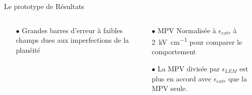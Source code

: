 \begin{frame}{Le prototype de \TOO{}}{Résultats}
\begin{scriptsize}
\begin{columns}
\begin{column}{0.5\textwidth}
\begin{itemize}
                        \item[$\bullet$] Grandes barres d'erreur à faibles champs dues aux imperfections de la planéité
                    \end{itemize}
                \end{column}
                \begin{column}{0.5\textwidth}
                    \begin{itemize}
                        \item[$\bullet$] MPV Normalisée à $\epsilon_{extr}$ à \SI{2}{\kilo\volt\per\centi\meter} pour comparer le comportement
                        \item[$\bullet$] La MPV divisée par  $\epsilon_{LEM}$ est plus en accord avec $\epsilon_{extr}$ que la MPV seule.
                    \end{itemize}
                \end{column}
            \end{columns}
        \end{scriptsize}
    \end{frame}

